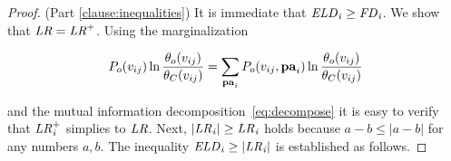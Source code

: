 		\begin{proof}
			(Part \ref{clause:inequalities}) It is immediate that $\it{ELD}_{i} \geq \it{FD}_{i}$. We show that $\it{LR} = \it{LR}^{+} $. Using the marginalization
			
			\begin{equation} \label{eq:marginalize}
			P_{o}( v_{ij}) \ln \frac{\theta_{o}( v_{ij})}{\theta_{C}( v_{ij})} = \sum_{\mathbf{pa}_{i}} 
			P_{o}( v_{ij},\mathbf{pa}_{i}) \ln \frac{\theta_{o}( v_{ij})}{\theta_{C}( v_{ij})} 
			\end{equation}
			
			
			and the mutual information decomposition~\eqref{eq:decompose}
			it is easy to verify that $\it{LR}_{i}^{+}$ simplies to $\it{LR}$. Next, $|\it{LR}_{i}| \geq \it{LR}_{i}$ holds because $a-b \leq |a-b|$ for any numbers $a,b$. The inequality $\it{ELD}_{i} \geq |\it{LR}_{i}|$ is established as follows.
			

\end{proof}
